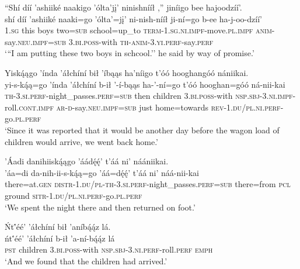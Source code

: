 \ea\label{ex:text1-18}
``Shí díí ’ashiiké naakigo ’ólta’jį’ ninishnííł ,'' jiníigo bee hajoodzíí’.\\
\gll shí	díí	’ashiiké	naaki=go	’ólta’=jį’	ni-nish-nííł	ji-ní=go	b-ee	ha-j-oo-dzíí’\\
     1.\textsc{sg}	this	boys	two=\textsc{sub}	school=up\_to	\textsc{term}-1.\textsc{sg}.\textsc{ni}.\textsc{impf}-move.\textsc{pl}.\textsc{impf}	\textsc{anim}-say.\textsc{neu}.\textsc{impf}=\textsc{sub}	3.\textsc{bi}.\textsc{poss}-with	\textsc{th}-\textsc{anim}-3.\textsc{yi}.\textsc{perf}-say.\textsc{perf}\\
\glt `{``}I am putting these two boys in schcool.'' he said by way of promise.'
\z

\ea\label{ex:text1-19-1}
Yiską́ągo ’índa ’áłchíní bił ’íbąąs ha’níigo t’óó hooghangóó nániikai.\\
\gll yi-s-ką́ą=go	’índa	’áłchíní	b-ił	’-í-bąąs	ha-’-ní=go	t’óó	hooghan=góó	ná-nii-kai\\
     \textsc{th}-3.\textsc{si}.\textsc{perf}-night\_passes.\textsc{perf}=\textsc{sub}	then	children	3.\textsc{bi}.\textsc{poss}-with	\textsc{nsp}.\textsc{sbj}-3.\textsc{ni}.\textsc{impf}-roll.\textsc{cont}.\textsc{impf}	\textsc{ar}-\textsc{d}-say.\textsc{neu}.\textsc{impf}=\textsc{sub}	just	home=towards	\textsc{rev}-1.\textsc{du}/\textsc{pl}.\textsc{ni}.\textsc{perf}-go.\textsc{pl}.\textsc{perf}\\
\glt `Since it was reported that it would be another day before the wagon load of children would arrive, we went back home.'
\z

\ea\label{ex:text1-19-2}
’Áadi danihiiską́ągo ’áádę́ę́’ t’áá ni’ náániikai.\\
\gll ’áa=di	da-nih-ii-s-ką́ą=go	’áá=dę́ę́’	t’áá	ni’	náá-nii-kai\\
     there=at.\textsc{gen}	\textsc{distr}-1.\textsc{du}/\textsc{pl}-\textsc{th}-3.\textsc{si}.\textsc{perf}-night\_passes.\textsc{perf}=\textsc{sub}	there=from	\textsc{pcl}	ground	\textsc{sitr}-1.\textsc{du}/\textsc{pl}.\textsc{ni}.\textsc{perf}-go.\textsc{pl}.\textsc{perf}\\
\glt `We spent the night there and then returned on foot.'
\z

\ea\label{ex:text1-20-1}
Ńt’́éé’ ’áłchíní bił ’aníbą́ą́z lá.\\
\gll ńt’́éé’	’áłchíní	b-ił	’a-ní-bą́ą́z	lá\\
     \textsc{pst}	children	3.\textsc{bi}.\textsc{poss}-with	\textsc{nsp}.\textsc{sbj}-3.\textsc{ni}.\textsc{perf}-roll.\textsc{perf}	\textsc{emph}\\
\glt `And we found that the children had arrived.'
\z

